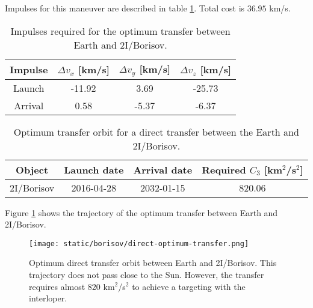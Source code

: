 Impulses for this maneuver are described in table
\ref{tab:borisov-direct-transfer-impulses}. Total cost is $36.95$ km/s.

\begin{table}[H]
  \centering
  \begin{tabular}{|c|c|c|c|}
    \hline
    Impulse & $\Delta v_x$ [km/s] & $\Delta v_y$ [km/s] & $\Delta v_z$ [km/s] \\
    \hline
    Launch & -11.92 & 3.69 & -25.73 \\
    \hline
    Arrival & 0.58 & -5.37 & -6.37 \\
    \hline
  \end{tabular}
  \caption{Impulses required for the optimum transfer between Earth and 2I/Borisov.}
  \label{tab:borisov-direct-transfer-impulses}
\end{table}


\vspace{1cm}
\begin{table}[H]
  \centering
  \begin{tabular}{|c|c|c|c|}
    \hline
    Object & Launch date & Arrival date & Required $C_3$ [km$^2$/s$^2$] \\
    \hline
    2I/Borisov & 2016-04-28 & 2032-01-15 & 820.06 \\
    \hline
  \end{tabular}
  \caption{Optimum transfer orbit for a direct transfer between the Earth and 2I/Borisov.}
  \label{tab:borisov-direct-transfer-optimum}
\end{table}

Figure \ref{fig:borisov-direct-transfer-orbit} shows the trajectory of the
optimum transfer between Earth and 2I/Borisov.

\begin{figure}[H]
  \centering
  \texttt{[image: static/borisov/direct-optimum-transfer.png]}
  \caption{Optimum direct transfer orbit between Earth and 2I/Borisov. This
        trajectory does not pass close to the Sun. However, the transfer requires almost $820$
        km$^2$/s$^2$ to achieve a targeting with the interloper.}
  \label{fig:borisov-direct-transfer-orbit}
\end{figure}
